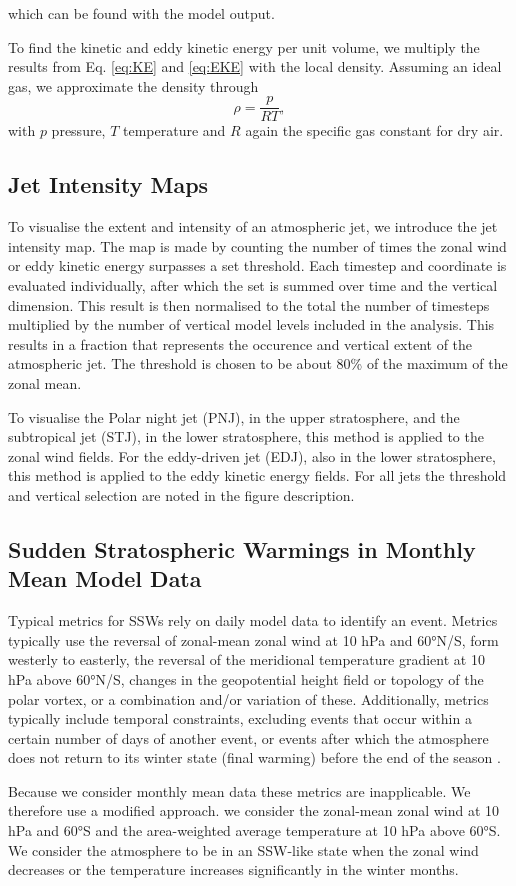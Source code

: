 which can be found with the model output. 

To find the kinetic and eddy kinetic energy per unit volume, we multiply the results from Eq. \ref{eq:KE} and \ref{eq:EKE} with the local density. Assuming an ideal gas, we approximate the density through
\begin{equation}
    \rho = \frac{p}{RT},
\end{equation}
\noindent with $p$ pressure, $T$ temperature and $R$ again the specific gas constant for dry air. 


\subsection{Jet Intensity Maps}
To visualise the extent and intensity of an atmospheric jet, we introduce the jet intensity map. The map is made by counting the number of times the zonal wind or eddy kinetic energy surpasses a set threshold. Each timestep and coordinate is evaluated individually, after which the set is summed over time and the vertical dimension. This result is then normalised to the total the number of timesteps multiplied by the number of vertical model levels included in the analysis. This results in a fraction that represents the occurence and vertical extent of the atmospheric jet. The threshold is chosen to be about 80\% of the maximum of the zonal mean.

To visualise the Polar night jet (PNJ), in the upper stratosphere, and the subtropical jet (STJ), in the lower stratosphere, this method is applied to the zonal wind fields. For the eddy-driven jet (EDJ), also in the lower stratosphere, this method is applied to the eddy kinetic energy fields. For all jets the threshold and vertical selection are noted in the figure description. 

\subsection{Sudden Stratospheric Warmings in Monthly Mean Model Data}
Typical metrics for SSWs rely on daily model data to identify an event. Metrics typically use the reversal of zonal-mean zonal wind at 10 hPa and 60°N/S, form westerly to easterly, the reversal of the meridional temperature gradient at 10 hPa above 60°N/S, changes in the geopotential height field or topology of the polar vortex, or a combination and/or variation of these. Additionally, metrics typically include temporal constraints, excluding events that occur within a certain number of days of another event, or events after which the atmosphere does not return to its winter state (final warming) before the end of the season \parencite{butler2015}. 

Because we consider monthly mean data these metrics are inapplicable. We therefore use a modified approach. we consider the zonal-mean zonal wind at 10 hPa and 60°S and the area-weighted average temperature at 10 hPa above 60°S. We consider the atmosphere to be in an SSW-like state when the zonal wind decreases or the temperature increases significantly in the winter months.